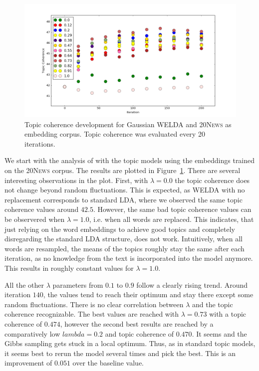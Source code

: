 \documentclass[
        a4paper,
        titlepage,
        twoside,
        parskip
        ]{scrbook}
\theoremstyle{break}
\begin{document}
\begin{figure}
       \centering
       \includegraphics[width=\textwidth]{figures/welda_gaussian_lambda_20news.png}
       \caption{Topic coherence development for Gaussian WELDA and \textsc{20News} as embedding corpus. Topic coherence was evaluated every 20 iterations.}
       \label{fig:welda_gaussian_lambda_20news}
\end{figure}

We start with the analysis of with the topic models using the embeddings trained on the \textsc{20News} corpus.
The results are plotted in Figure~\ref{fig:welda_gaussian_lambda_20news}.
There are several interesting observations in the plot.
First, with $\lambda = 0.0$ the topic coherence does not change beyond random fluctuations.
This is expected, as WELDA with no replacement corresponds to standard LDA, where we observed the same topic coherence values around $42.5$.
However, the same bad topic coherence values can be observered when $\lambda = 1.0$, i.e. when all words are replaced.
This indicates, that just relying on the word embeddings to achieve good topics and completely disregarding the standard LDA structure, does not work.
Intuitively, when all words are resampled, the means of the topics roughly stay the same after each iteration, as no knowledge from the text is incorporated into the model anymore.
This results in roughly constant values for $\lambda = 1.0$.

All the other $\lambda$ parameters from $0.1$ to $0.9$ follow a clearly rising trend.
Around iteration $140$, the values tend to reach their optimum and stay there except some random fluctuations.
There is no clear correlation between $\lambda$ and the topic coherence recognizable.
The best values are reached with $\lambda = 0.73$ with a topic coherence of $0.474$, however the second best results are reached by a comparatively low $lambda = 0.2$ and topic coherence of $0.470$.
It seems and the Gibbs sampling gets stuck in a local optimum.
Thus, as in standard topic models, it seems best to rerun the model several times and pick the best.
This is an improvement of $0.051$ over the baseline value.
\end{document}
